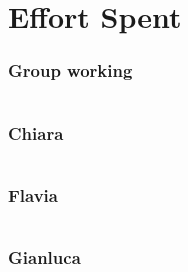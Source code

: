 \chapter{Effort Spent}
\subsection*{Group working}
\begin{table}[H]
    \begin{tabular}{lr}
        \toprule
        \bottomrule
    \end{tabular}
\end{table}

\subsection*{Chiara}
\begin{table}[H]
    \begin{tabular}{lr}
        \toprule
        \bottomrule
    \end{tabular}
\end{table}

\subsection*{Flavia}
\begin{table}[H]
    \begin{tabular}{lr}
        \toprule
        \bottomrule
    \end{tabular}
\end{table}

\subsection*{Gianluca}
\begin{table}[H]
    \begin{tabular}{lr}
        \toprule
        \bottomrule
    \end{tabular}
\end{table}
